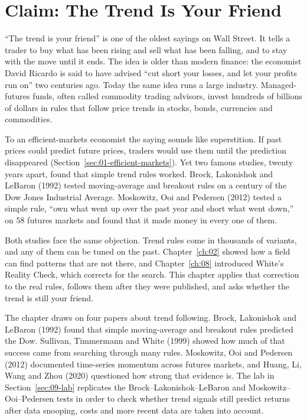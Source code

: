 \makeatletter
{}
\makeatother

\chapter{Claim: The Trend Is Your Friend}
\label{ch:09}

``The trend is your friend'' is one of the oldest sayings on Wall Street. It tells a trader to buy what has been rising and sell what has been falling, and to stay with the move until it ends. The idea is older than modern finance: the economist David Ricardo is said to have advised ``cut short your losses, and let your profits run on'' two centuries ago. Today the same idea runs a large industry. Managed-futures funds, often called commodity trading advisors, invest hundreds of billions of dollars in rules that follow price trends in stocks, bonds, currencies and commodities.

To an efficient-markets economist the saying sounds like superstition. If past prices could predict future prices, traders would use them until the prediction disappeared (Section~\ref{sec:01-efficient-markets}). Yet two famous studies, twenty years apart, found that simple trend rules worked. Brock, Lakonishok and LeBaron (1992) tested moving-average and breakout rules on a century of the Dow Jones Industrial Average. Moskowitz, Ooi and Pedersen (2012) tested a simple rule, ``own what went up over the past year and short what went down,'' on 58 futures markets and found that it made money in every one of them.

Both studies face the same objection. Trend rules come in thousands of variants, and any of them can be tuned on the past. Chapter~\ref{ch:02} showed how a field can find patterns that are not there, and Chapter~\ref{ch:08} introduced White's Reality Check, which corrects for the search. This chapter applies that correction to the real rules, follows them after they were published, and asks whether the trend is still your friend.

The chapter draws on four papers about trend following. Brock, Lakonishok and LeBaron (1992) found that simple moving-average and breakout rules predicted the Dow. Sullivan, Timmermann and White (1999) showed how much of that success came from searching through many rules. Moskowitz, Ooi and Pedersen (2012) documented time-series momentum across futures markets, and Huang, Li, Wang and Zhou (2020) questioned how strong that evidence is. The lab in Section~\ref{sec:09-lab} replicates the Brock--Lakonishok--LeBaron and Moskowitz--Ooi--Pedersen tests in order to check whether trend signals still predict returns after data snooping, costs and more recent data are taken into account.

